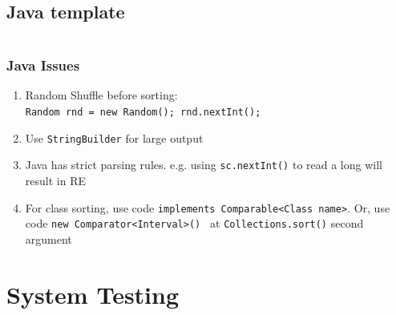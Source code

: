 \documentclass[10pt,oneside]{article}
\begin{document}
\begin{landscape}
\begin{multicols}{2}
% 




\subsection{Java template}
%
\inputminted{java}{contest_setup/Main.java}

\subsubsection{Java Issues}
{\normalsize
\begin{enumerate}
\item Random Shuffle before sorting:\\ \texttt{Random rnd = new Random(); rnd.nextInt();}
\item Use \texttt{StringBuilder} for large output
\item Java has strict parsing rules. e.g. using \texttt{sc.nextInt()} to read a long will result in RE
\item For class sorting, use code \texttt{implements Comparable<Class name>}. Or, use code \texttt{new Comparator<Interval>() {}} at \texttt{Collections.sort()} second argument
\end{enumerate}
}

\section{System Testing}


\end{multicols}
\end{landscape}
\end{document}
